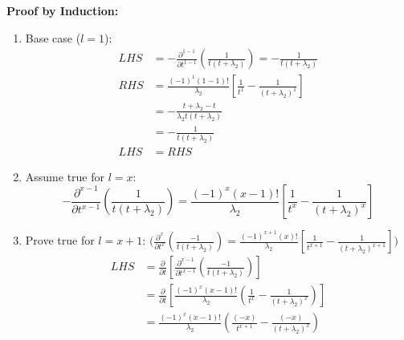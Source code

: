 \begin{itemize}
    \textbf{Proof by Induction:}
    \begin{enumerate}
        \item Base case (\(l=1\)):
        \begin{equation*}
            \begin{split}
                LHS &= -\frac{\partial^{1-1}}{\partial t^{1-1}} 
                \left( \frac{1}{t(t + \lambda_2)}\right) = 
                - \frac{1}{t(t + \lambda_2)} \\
                RHS &= \frac{(-1)^{1} (1-1)!}{\lambda_2}
                \left[\frac{1}{t^1} - \frac{1}{(t + \lambda_2)^1}\right] \\
                &= - \frac{t + \lambda_2 - t}{\lambda_2 t (t + \lambda_2)} \\
                &= - \frac{1}{t (t + \lambda_2)} \\
                LHS &= RHS
            \end{split}
        \end{equation*}
        \item Assume true for \(l = x\):
        \begin{equation*}
            -\frac{\partial^{x-1}}{\partial t^{x-1}} 
            \left( \frac{1}{t(t + \lambda_2)}\right) = 
            \frac{(-1)^{x} (x-1)!}{\lambda_2}
            \left[\frac{1}{t^x} - \frac{1}{(t + \lambda_2)^x}\right]
        \end{equation*}
        \item Prove true for \(l = x + 1\): 
        \(\Bigg( \frac{\partial^x}{\partial t ^ x} 
        \left( \frac{-1}{t (t + \lambda_2)} \right) = 
        \frac{(-1)^{x + 1} (x)!}{\lambda_2}
        \left[\frac{1}{t^{x+1}}-\frac{1}{(t + \lambda_2)^{x+1}}\right] \Bigg)\)
        \begin{equation*}
            \begin{split}
                LHS &= \frac{\partial}{\partial t}
                \left[ \frac{\partial^{x-1}}{\partial t ^ {x-1}} 
                \left( \frac{-1}{t (t + \lambda_2)} \right) \right] \\
                &= \frac{\partial}{\partial t} \left[
                    \frac{(-1)^x (x-1)!}{\lambda_2} \left(
                        \frac{1}{t^x} - \frac{1}{(t + \lambda_2)^x}
                    \right)
                \right] \\
                &= \frac{(-1)^x (x-1)!}{\lambda_2} \left(
                    \frac{(-x)}{t^{x+1}} - \frac{(-x)}{(t + \lambda_2)^x}
                \right) \\

\end{split}
\end{equation*}
\end{enumerate}
\end{itemize}
